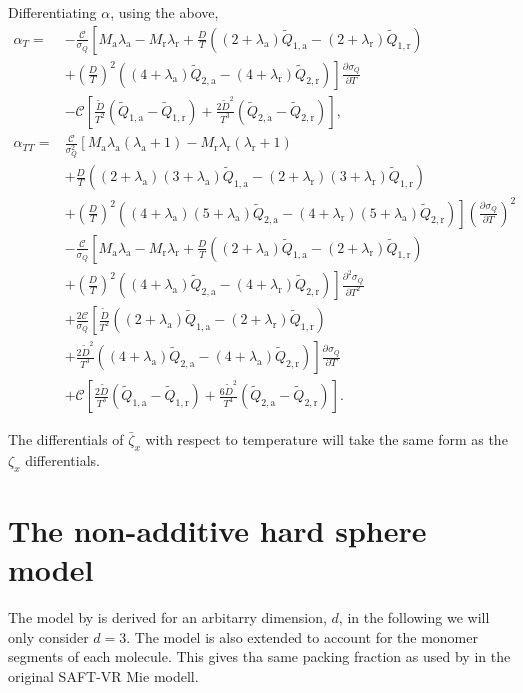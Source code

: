 \documentclass[english]{../thermomemo/thermomemo}
\newcommand*{\pd}[3][]{\frac{\partial^{#1}#2}{\partial{#3}^{#1}}}%
\newcommand*{\lb}{\left(}
\newcommand*{\rb}{\right)}
\newcommand{\lama}{\ensuremath{{\lambda_{\text{a}}}}\xspace}
\newcommand{\lamr}{\ensuremath{{\lambda_{\text{r}}}}\xspace}
\newcommand{\Dt}{\ensuremath{\tilde{D}}\xspace}
\newcommand{\Qt}{\ensuremath{\tilde{Q}}\xspace}
\newcommand{\z}{\zeta}
\newcommand{\zb}{\bar{\zeta}}
\newcommand{\att}{\ensuremath{\text{a}}\xspace}
\newcommand{\rep}{\ensuremath{\text{r}}\xspace}
\begin{document}
Differentiating $\alpha$, using the above,
\begin{align}
  \label{eq:alpha_diff_T}
  \alpha_{T} =& -\frac{\mathcal{C}}{\sigma_{Q}} \left[ M_{\att} \lama - M_{\rep}\lamr  + \frac{D}{T} \lb \lb 2+\lama\rb\Qt_{1,\att} - \lb 2+\lamr\rb\Qt_{1,\rep}\rb \right. \nonumber \\ & \left. + \lb\frac{D}{T}\rb^2 \lb \lb 4+\lama\rb\Qt_{2,\att} - \lb 4+\lamr\rb\Qt_{2,\rep} \rb\right]\pd{\sigma_{Q}}{T}  \nonumber \\ &  - \mathcal{C}\left[ \frac{\Dt}{T^2} \lb \Qt_{1,\att} - \Qt_{1,\rep}\rb + \frac{2 \Dt^2}{T^3} \lb \Qt_{2,\att} - \Qt_{2,\rep}\rb\right] ,\\
  \alpha_{TT} =& \frac{\mathcal{C}}{\sigma_{Q}^2} \left[M_{\att} \lama\lb \lama + 1\rb - M_{\rep}\lamr\lb \lamr + 1\rb \right.  \nonumber \\ &+ \frac{D}{T} \lb \lb 2+\lama\rb\lb 3+\lama\rb\Qt_{1,\att} - \lb 2+\lamr\rb \lb 3+ \lamr\rb \Qt_{1,\rep}\rb \nonumber \\ & \left. + \lb\frac{D}{T}\rb^2 \lb \lb 4+\lama\rb\lb 5+\lama\rb\Qt_{2,\att} - \lb 4+\lamr\rb\lb 5+\lama\rb\Qt_{2,\rep} \rb\right] \lb \pd{\sigma_{Q}}{T} \rb^2  \nonumber \\ & -\frac{\mathcal{C}}{\sigma_{Q}} \left[ M_{\att} \lama - M_{\rep}\lamr  + \frac{D}{T} \lb \lb 2+\lama\rb\Qt_{1,\att} - \lb 2+\lamr\rb\Qt_{1,\rep}\rb \right. \nonumber \\ & \left. + \lb\frac{D}{T}\rb^2 \lb \lb 4+\lama\rb\Qt_{2,\att} - \lb 4+\lamr\rb\Qt_{2,\rep} \rb\right]\pd[2]{\sigma_{Q}}{T} \nonumber \\ &  + \frac{2\mathcal{C}}{\sigma_{Q}}\left[ \frac{\Dt}{T^2} \lb \lb 2+\lama\rb\Qt_{1,\att} - \lb 2+\lamr\rb\Qt_{1,\rep}\rb \right. \nonumber \\ & \left.+ \frac{2 \Dt^2}{T^3} \lb \lb 4+\lama\rb\Qt_{2,\att} - \lb 4+\lama\rb\Qt_{2,\rep}\rb\right]\pd{\sigma_{Q}}{T} \nonumber \\ &  + \mathcal{C}\left[ \frac{2 \Dt}{T^3} \lb \Qt_{1,\att} - \Qt_{1,\rep}\rb + \frac{6 \Dt^2}{T^4} \lb \Qt_{2,\att} - \Qt_{2,\rep}\rb\right].
\end{align}

The differentials of $\zb_x$ with respect to temperature will take the
same form as the $\z_x$ differentials.

\section{The non-additive hard sphere model}
The model by \citet{Santos2005} is derived for an arbitarry dimension,
$d$, in the following we will only consider $d=3$. The model is also
extended to account for the monomer segments of each molecule. This
gives tha same packing fraction as used by \cite{Lafitte2013} in the
original SAFT-VR Mie modell.
\end{document}
